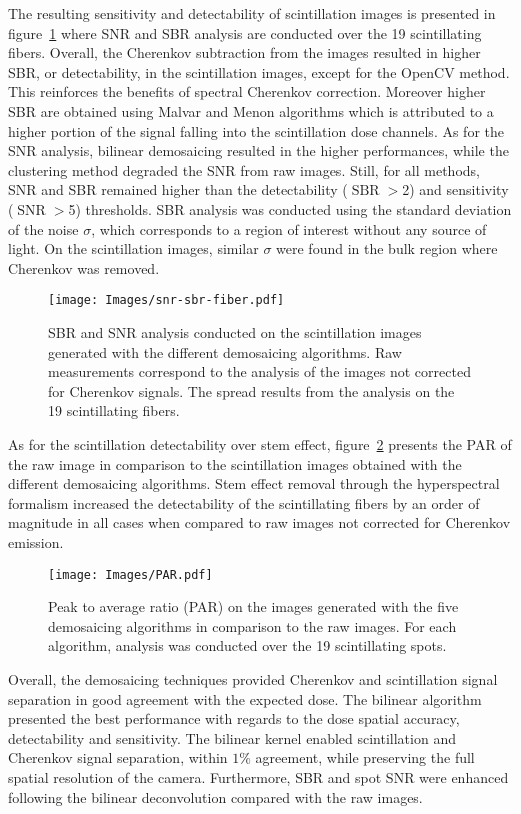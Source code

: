 \documentclass[12pt]{iopart}
\DeclareMathOperator{\SBR}{SBR}
\DeclareMathOperator{\SNR}{SNR}
\begin{document}
The resulting sensitivity and detectability of scintillation images is presented in figure~\ref{fig:snr_sbr} where SNR and SBR analysis are conducted over the 19 scintillating fibers. Overall, the Cherenkov subtraction from the images resulted in higher SBR, or detectability, in the scintillation images, except for the OpenCV method. This reinforces the benefits of spectral Cherenkov correction. Moreover higher SBR are obtained using Malvar and Menon algorithms which is attributed to a higher portion of the signal falling into the scintillation dose channels. As for the SNR analysis, bilinear demosaicing resulted in the higher performances, while the clustering method degraded the SNR from raw images. Still, for all methods, SNR and SBR remained higher than the detectability ($\SBR>$2) and sensitivity ($\SNR>$5) thresholds. SBR analysis was conducted using the standard deviation of the noise $\sigma$, which corresponds to a region of interest without any source of light. On the scintillation images, similar $\sigma$ were found in the bulk region where Cherenkov was removed. 
\begin{figure}[ht]
    \centering
    \texttt{[image: Images/snr-sbr-fiber.pdf]}
    \caption{SBR and SNR analysis conducted on the scintillation images generated with the different demosaicing algorithms. Raw measurements correspond to the analysis of the images not corrected for Cherenkov signals. The spread results from the analysis on the 19 scintillating fibers. }
    \label{fig:snr_sbr}
\end{figure}
As for the scintillation detectability over stem effect, figure~\ref{fig:par} presents the PAR of the raw image in comparison to the scintillation images obtained with the different demosaicing algorithms. Stem effect removal through the hyperspectral formalism increased the detectability of the scintillating fibers by an order of magnitude in all cases when compared to raw images not corrected for Cherenkov emission.  
\begin{figure}[ht]
    \centering
    \texttt{[image: Images/PAR.pdf]}
    \caption{Peak to average ratio (PAR) on the images generated with the five demosaicing algorithms in comparison to the raw images. For each algorithm, analysis was conducted over the 19 scintillating spots.}
    \label{fig:par}
\end{figure}

Overall, the demosaicing techniques provided Cherenkov and scintillation signal separation in good agreement with the expected dose. The bilinear algorithm presented the best performance with regards to the dose spatial accuracy, detectability and sensitivity. The bilinear kernel enabled scintillation and Cherenkov signal separation, within $1\%$ agreement, while preserving the full spatial resolution of the camera. Furthermore, SBR and spot SNR were enhanced following the bilinear deconvolution compared with the raw images.  
\end{document}
